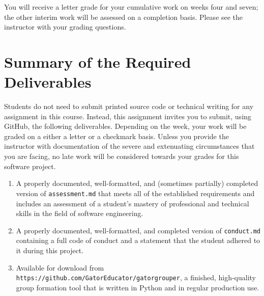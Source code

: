 \documentclass[11pt]{article}
\newcommand{\assessment}{\lstinline{assessment.md}}
\newcommand{\conduct}{\lstinline{conduct.md}}
\newcommand{\url}[1]{\lstinline{#1}}
\begin{document}
\noindent You will receive a letter grade for your cumulative work on weeks four
and seven; the other interim work will be assessed on a completion basis. Please
see the instructor with your grading questions.

\section*{Summary of the Required Deliverables}

\noindent Students do not need to submit printed source code or technical
writing for any assignment in this course. Instead, this assignment invites you
to submit, using GitHub, the following deliverables. Depending on the week, your
work will be graded on a either a letter or a checkmark basis.
%
Unless you provide the instructor with documentation of the severe and
extenuating circumstances that you are facing, no late work will be considered
towards your grades for this software project.

\begin{enumerate}

\setlength{\itemsep}{0in}

\item A properly documented, well-formatted, and (sometimes partially) completed
  version of \assessment{} that meets all of the established requirements and
  includes an assessment of a student's mastery of professional and technical
  skills in the field of software engineering.

\item A properly documented, well-formatted, and completed version of \conduct{}
  containing a full code of conduct and a statement that the student adhered to
  it during this project.

\item Available for download from
  \url{https://github.com/GatorEducator/gatorgrouper}, a finished, high-quality
  group formation tool that is written in Python and in regular production use.

\end{enumerate}
\end{document}

